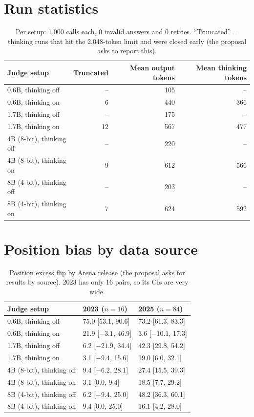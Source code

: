 \documentclass[10.5pt]{article}
\begin{document}
\section{Run statistics}
\begin{table}[H]
\centering\small
\caption{Per setup: 1{,}000 calls each, 0 invalid answers and 0 retries. ``Truncated'' = thinking runs that hit the
2{,}048-token limit and were closed early (the proposal asks to report this).}
\begin{tabular}{lrrr}
\toprule
Judge setup & Truncated & Mean output tokens & Mean thinking tokens \\
\midrule
0.6B, thinking off & -- & 105 & -- \\
0.6B, thinking on & 6 & 440 & 366 \\
1.7B, thinking off & -- & 175 & -- \\
1.7B, thinking on & 12 & 567 & 477 \\
4B (8-bit), thinking off & -- & 220 & -- \\
4B (8-bit), thinking on & 9 & 612 & 566 \\
8B (4-bit), thinking off & -- & 203 & -- \\
8B (4-bit), thinking on & 7 & 624 & 592 \\
\bottomrule
\end{tabular}
\end{table}

\section{Position bias by data source}
\label{sec:source}
\begin{table}[H]
\centering\small
\caption{Position excess flip by Arena release (the proposal asks for results by source). 2023 has only 16 pairs,
so its CIs are very wide.}
\begin{tabular}{lll}
\toprule
Judge setup & 2023 ($n=16$) & 2025 ($n=84$) \\
\midrule
0.6B, thinking off & 75.0 [53.1, 90.6] & 73.2 [61.3, 83.3] \\
0.6B, thinking on & 21.9 [$-3.1$, 46.9] & 3.6 [$-10.1$, 17.3] \\
1.7B, thinking off & 6.2 [$-21.9$, 34.4] & 42.3 [29.8, 54.2] \\
1.7B, thinking on & 3.1 [$-9.4$, 15.6] & 19.0 [6.0, 32.1] \\
4B (8-bit), thinking off & 9.4 [$-6.2$, 28.1] & 27.4 [15.5, 39.3] \\
4B (8-bit), thinking on & 3.1 [0.0, 9.4] & 18.5 [7.7, 29.2] \\
8B (4-bit), thinking off & 6.2 [$-9.4$, 25.0] & 48.2 [36.3, 60.1] \\
8B (4-bit), thinking on & 9.4 [0.0, 25.0] & 16.1 [4.2, 28.0] \\
\bottomrule
\end{tabular}
\end{table}
\end{document}
